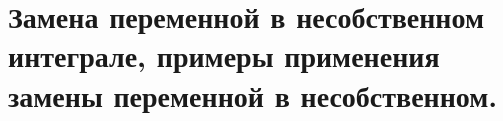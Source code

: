 \documentclass[../main.tex]{subfiles}
\begin{document}
\newpage
\section{Замена переменной в несобственном интеграле, примеры применения замены переменной в несобственном.}
\end{document}
